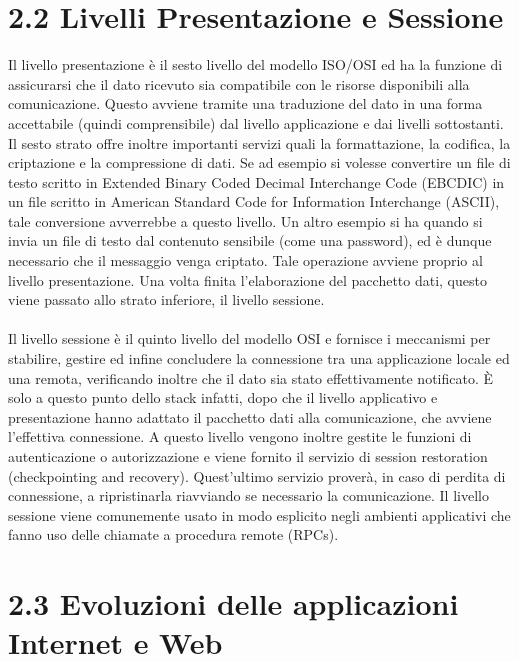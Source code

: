 \documentclass{report}%
\theoremstyle{plain}
\begin{document}
\section*{2.2 Livelli Presentazione e Sessione}
Il livello presentazione è il sesto livello del modello ISO/OSI ed ha la funzione di assicurarsi che il dato ricevuto sia compatibile con le risorse disponibili alla comunicazione. Questo avviene tramite una traduzione del dato in una forma accettabile (quindi comprensibile) dal livello applicazione e dai livelli sottostanti.\\Il sesto strato offre inoltre importanti servizi quali la formattazione, la codifica, la criptazione e la compressione di dati. Se ad esempio si volesse convertire un file di testo scritto in Extended Binary Coded Decimal Interchange Code (EBCDIC) in un file scritto in  American Standard Code for Information Interchange (ASCII), tale conversione avverrebbe a questo livello. Un altro esempio si ha quando si invia un file di testo dal contenuto sensibile (come una password), ed è dunque necessario che il messaggio venga criptato. Tale operazione avviene proprio al livello presentazione. Una volta finita l'elaborazione del pacchetto dati, questo viene passato allo strato inferiore, il livello sessione.\\\\
Il livello sessione è il quinto livello del modello OSI e fornisce i meccanismi per stabilire, gestire ed infine concludere la connessione tra una applicazione locale ed una remota, verificando inoltre che il dato sia stato effettivamente notificato. È solo a questo punto dello stack infatti, dopo che il livello applicativo e presentazione hanno adattato il pacchetto dati alla comunicazione, che avviene l'effettiva connessione. A questo livello vengono inoltre gestite le funzioni di autenticazione o autorizzazione e viene fornito il servizio di session restoration (checkpointing and recovery). Quest'ultimo servizio proverà, in caso di perdita di connessione, a ripristinarla riavviando se necessario la comunicazione.
Il livello sessione viene comunemente usato in modo esplicito negli ambienti applicativi che fanno uso delle chiamate a procedura remote (RPCs). 
\section*{2.3 Evoluzioni delle applicazioni Internet e Web}
\end{document}
